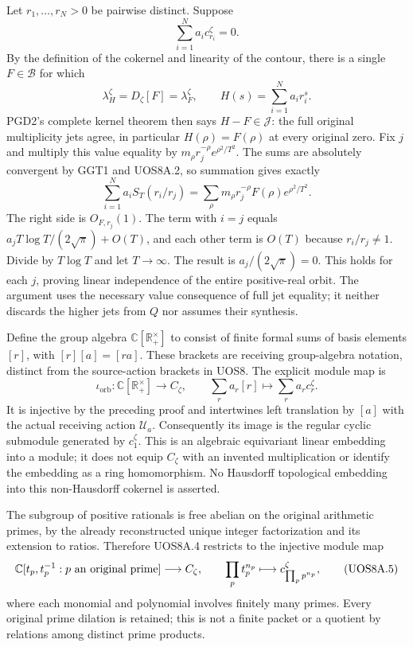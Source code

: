 Let \(r_1,\ldots,r_N>0\) be pairwise distinct. Suppose \[
 \sum_{i=1}^N a_i c_{r_i}^\zeta=0 .
\] By the definition of the cokernel and linearity of the contour, there
is a single \(F\in\mathcal B\) for which \[
 \lambda_H^\zeta=D_\zeta[F]=\lambda_F^\zeta,
 \qquad H(s)=\sum_{i=1}^N a_i r_i^s.
\] PGD2's complete kernel theorem then says \(H-F\in\mathcal J\): the
full original multiplicity jets agree, in particular \(H(\rho)=F(\rho)\)
at every original zero. Fix \(j\) and multiply this value equality by
\(m_\rho r_j^{-\rho}e^{\rho^2/T^2}\). The sums are absolutely convergent
by GGT1 and UOS8A.2, so summation gives exactly \[
 \sum_{i=1}^N a_i S_T(r_i/r_j)
 =\sum_\rho m_\rho r_j^{-\rho}F(\rho)e^{\rho^2/T^2}.
 \tag{UOS8A.3}
\] The right side is \(O_{F,r_j}(1)\). The term with \(i=j\) equals
\(a_jT\log T/(2\sqrt\pi)+O(T)\), and each other term is \(O(T)\) because
\(r_i/r_j\ne1\). Divide by \(T\log T\) and let \(T\to\infty\). The
result is \(a_j/(2\sqrt\pi)=0\). This holds for each \(j\), proving
linear independence of the entire positive-real orbit. The argument uses
the necessary value consequence of full jet equality; it neither
discards the higher jets from \(Q\) nor assumes their synthesis.

Define the group algebra \(\mathbb C[\mathbb R_+^\times]\) to consist of
finite formal sums of basis elements \([r]\), with \([r][a]=[ra]\).
These brackets are receiving group-algebra notation, distinct from the
source-action brackets in UOS8. The explicit module map is \[
 \boxed{
 \iota_{\mathrm{orb}}:
 \mathbb C[\mathbb R_+^\times]\longrightarrow C_\zeta,
 \qquad \sum_r a_r[r]\longmapsto\sum_r a_r c_r^\zeta .
 }
 \tag{UOS8A.4}
\] It is injective by the preceding proof and intertwines left
translation by \([a]\) with the actual receiving action
\(\mathcal U_a\). Consequently its image is the regular cyclic submodule
generated by \(c_1^\zeta\). This is an algebraic equivariant linear
embedding into a module; it does not equip \(C_\zeta\) with an invented
multiplication or identify the embedding as a ring homomorphism. No
Hausdorff topological embedding into this non-Hausdorff cokernel is
asserted.

The subgroup of positive rationals is free abelian on the original
arithmetic primes, by the already reconstructed unique integer
factorization and its extension to ratios. Therefore UOS8A.4 restricts
to the injective module map \[
 \mathbb C[t_p,t_p^{-1}:p\ {\rm an\ original\ prime}]
 \longrightarrow C_\zeta,\qquad
 \prod_p t_p^{n_p}\longmapsto c_{\prod_p p^{n_p}}^\zeta ,
 \tag{UOS8A.5}
\] where each monomial and polynomial involves finitely many primes.
Every original prime dilation is retained; this is not a finite packet
or a quotient by relations among distinct prime products.

